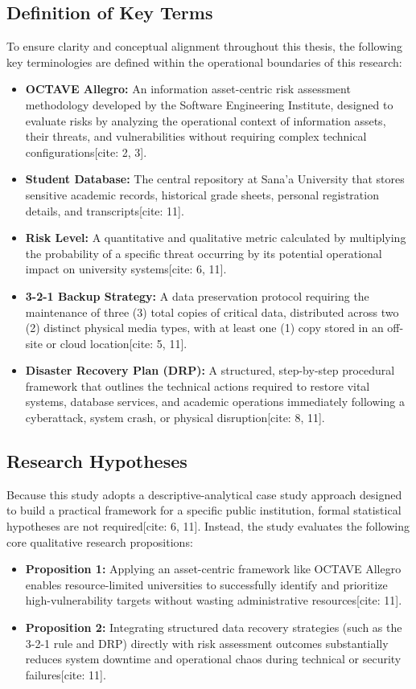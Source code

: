 \documentclass[journal,onecolumn,12pt,twoside]{IEEEtran}
\begin{document}
	\subsection{Definition of Key Terms}
	\label{subsec:definitions}
	To ensure clarity and conceptual alignment throughout this thesis, the following key terminologies are defined within the operational boundaries of this research:
	\begin{itemize}
		\item \textbf{OCTAVE Allegro:} An information asset-centric risk assessment methodology developed by the Software Engineering Institute, designed to evaluate risks by analyzing the operational context of information assets, their threats, and vulnerabilities without requiring complex technical configurations[cite: 2, 3].
		\item \textbf{Student Database:} The central repository at Sana'a University that stores sensitive academic records, historical grade sheets, personal registration details, and transcripts[cite: 11].
		\item \textbf{Risk Level:} A quantitative and qualitative metric calculated by multiplying the probability of a specific threat occurring by its potential operational impact on university systems[cite: 6, 11].
		\item \textbf{3-2-1 Backup Strategy:} A data preservation protocol requiring the maintenance of three (3) total copies of critical data, distributed across two (2) distinct physical media types, with at least one (1) copy stored in an off-site or cloud location[cite: 5, 11].
		\item \textbf{Disaster Recovery Plan (DRP):} A structured, step-by-step procedural framework that outlines the technical actions required to restore vital systems, database services, and academic operations immediately following a cyberattack, system crash, or physical disruption[cite: 8, 11].
	\end{itemize}
	
	\subsection{Research Hypotheses}
	\label{subsec:hypotheses}
	Because this study adopts a descriptive-analytical case study approach designed to build a practical framework for a specific public institution, formal statistical hypotheses are not required[cite: 6, 11]. Instead, the study evaluates the following core qualitative research propositions:
	\begin{itemize}
		\item \textbf{Proposition 1:} Applying an asset-centric framework like OCTAVE Allegro enables resource-limited universities to successfully identify and prioritize high-vulnerability targets without wasting administrative resources[cite: 11].
		\item \textbf{Proposition 2:} Integrating structured data recovery strategies (such as the 3-2-1 rule and DRP) directly with risk assessment outcomes substantially reduces system downtime and operational chaos during technical or security failures[cite: 11].
	\end{itemize}
	
\end{document}
